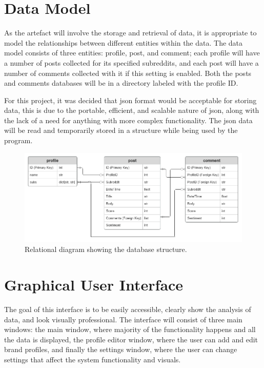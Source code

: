 \section{Data Model}
As the artefact will involve the storage and retrieval of data, it is appropriate to model the relationships between different entities within the data. The data model consists of three entities: profile, post, and comment; each profile will have a number of posts collected for its specified subreddits, and each post will have a number of comments collected with it if this setting is enabled. Both the posts and comments databases will be in a directory labeled with the profile ID.

For this project, it was decided that json format would be acceptable for storing data, this is due to the portable, efficient, and scalable nature of json, along with the lack of a need for anything with more complex functionality. The json data will be read and temporarily stored in a  structure while being used by the program.

\begin{figure}[h]
    \centering
    \includegraphics[width=\textwidth]{figures/database-relationship-diagram.png}
    \caption{Relational diagram showing the database structure.}
\end{figure}

\section{Graphical User Interface}
The goal of this interface is to be easily accessible, clearly show the analysis of data, and look visually professional. The interface will consist of three main windows: the main window, where majority of the functionality happens and all the data is displayed, the profile editor window, where the user can add and edit brand profiles, and finally the settings window, where the user can change settings that affect the system functionality and visuals.


